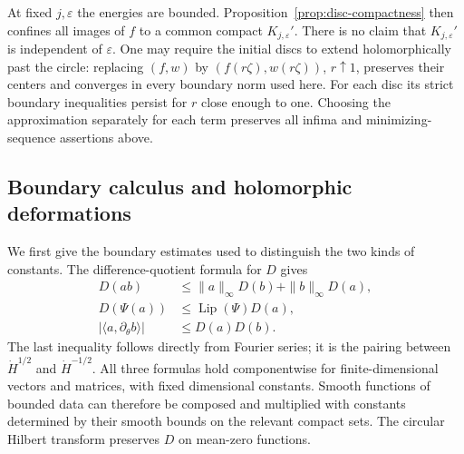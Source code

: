 \documentclass[11pt]{article}
\theoremstyle{definition}
\theoremstyle{remark}
\newcommand{\eps}{\varepsilon}
\DeclareMathOperator{\Lip}{Lip}
\numberwithin{equation}{section}
\begin{document}
At fixed $j,\eps$ the energies are bounded.  Proposition~\ref{prop:disc-compactness}
then confines all images of $f$ to a common compact $K_{j,\eps}'$.
There is no claim that $K_{j,\eps}'$ is independent of $\eps$.
One may require the initial discs to extend holomorphically past the
circle: replacing $(f,w)$ by $(f(r\zeta),w(r\zeta))$, $r\uparrow1$,
preserves their centers and converges in every boundary norm used here.
For each disc its strict boundary inequalities persist for $r$ close
enough to one.  Choosing the approximation separately for each term
preserves all infima and minimizing-sequence assertions above.

\subsection{Boundary calculus and holomorphic deformations}

We first give the boundary estimates used to distinguish the two kinds
of constants.  The difference-quotient formula for $D$ gives
\begin{equation}
 \begin{split}
 D(ab)&\le\|a\|_\infty D(b)+\|b\|_\infty D(a),\\
 D(\Psi(a))&\le\Lip(\Psi)D(a),\\
 |\langle a,\partial_\theta b\rangle|&\le D(a)D(b).
 \end{split}
 \label{var:boundary-calculus}
\end{equation}
The last inequality follows directly from Fourier series; it is the
pairing between $\dot H^{1/2}$ and $\dot H^{-1/2}$.  All three formulas
hold componentwise for finite-dimensional vectors and matrices, with
fixed dimensional constants.  Smooth functions of bounded data can
therefore be composed and multiplied with constants determined by their
smooth bounds on the relevant compact sets.  The circular Hilbert
transform preserves $D$ on mean-zero functions.
\end{document}
